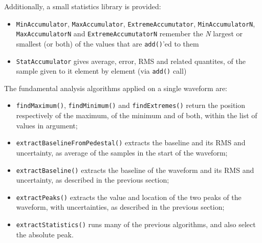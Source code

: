 Additionally, a small statistics library is provided:
\begin{itemize}
  \item
    \texttt{MinAccumulator}, \texttt{MaxAccumulator},
    \texttt{ExtremeAccumutator}, \texttt{MinAccumulatorN},
    \texttt{MaxAccumulatorN} and \texttt{ExtremeAccumutatorN} remember the
    \emph{N} largest or smallest (or both) of the values that are
    \texttt{add()}'ed to them
  \item \texttt{StatAccumulator} gives average,
    error, RMS and related quantites, of the sample given to it element by
    element (via \texttt{add()} call)
\end{itemize}
The fundamental analysis algorithms applied on a single waveform are:
\begin{itemize}
  \item
    \texttt{findMaximum()}, \texttt{findMinimum()} and
    \texttt{findExtremes()} return the position respectively of the maximum,
    of the minimum and of both, within the list of values in argument;
  \item
    \texttt{extractBaselineFromPedestal()} extracts the baseline and its RMS
    and uncertainty, as average of the samples in the start of the waveform;
  \item \texttt{extractBaseline()} extracts the baseline of the waveform and
    its RMS and uncertainty, as described in the previous section;
  \item
    \texttt{extractPeaks()} extracts the value and location of the two peaks
    of the waveform, with uncertainties, as described in the previous
    section;
  \item \texttt{extractStatistics()} runs many of the previous
    algorithms, and also select the absolute peak.
\end{itemize}
